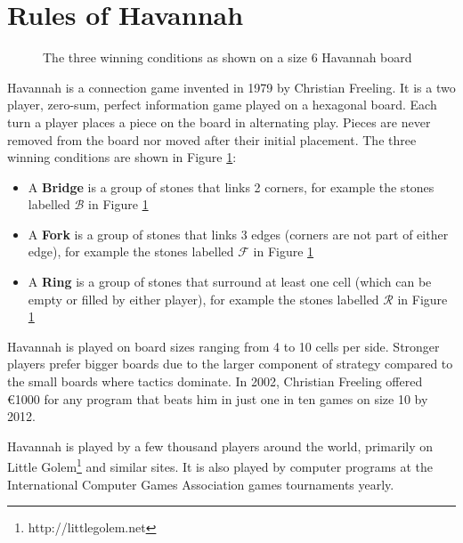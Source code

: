 
\section{Rules of Havannah}


\begin{figure}
\centering
\begin{HavannahBoard}[board size=6,coordinate style=classical]
\end{HavannahBoard}
\caption{The three winning conditions as shown on a size 6 Havannah board}
\label{fig:rules}
\end{figure}

Havannah is a connection game invented in 1979 by Christian Freeling. It is a two player, zero-sum, perfect information game played on a hexagonal board. Each turn a player places a piece on the board in alternating play. Pieces are never removed from the board nor moved after their initial placement. The three winning conditions are shown in Figure \ref{fig:rules}:
\begin{itemize}
	\setlength{\itemsep}{0pt}
	\setlength{\parskip}{0pt}
	\setlength{\parsep}{0pt}
	\item A \textbf{Bridge} is a group of stones that links 2 corners, for example the stones labelled $\mathcal B$ in Figure \ref{fig:rules}
	\item A \textbf{Fork} is a group of stones that links 3 edges (corners are not part of either edge), for example the stones labelled $\mathcal F$ in Figure \ref{fig:rules}
	\item A \textbf{Ring} is a group of stones that surround at least one cell (which can be empty or filled by either player), for example the stones labelled $\mathcal R$ in Figure \ref{fig:rules}
\end{itemize}

Havannah is played on board sizes ranging from 4 to 10 cells per side. Stronger players prefer bigger boards due to the larger component of strategy compared to the small boards where tactics dominate. In 2002, Christian Freeling offered \euro 1000 for any program that beats him in just one in ten games on size 10 by 2012.

Havannah is played by a few thousand players around the world, primarily on Little Golem\footnote{http://littlegolem.net} and similar sites. It is also played by computer programs at the International Computer Games Association games tournaments yearly.



